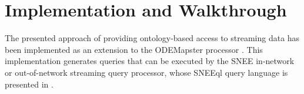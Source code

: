 \section{Implementation and Walkthrough}
\label{execution}

The presented approach of providing ontology-based access to streaming data has been implemented as an extension to the
ODEMapster processor \cite{Barrasa_04}. This implementation generates queries that can be executed by the SNEE
in-network or out-of-network streaming query processor, whose SNEEql query language is presented in
\cite{Brenninkmeijer_08}.





